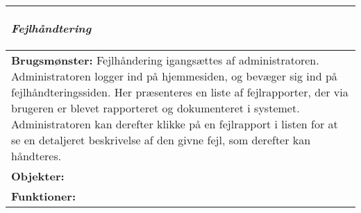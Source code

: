 \begin{tabular}{p{\textwidth}}
    \hline
    \begin{center} 
    \textbf{\textit{Fejlhåndtering}} 
    \end{center} \\ \hline
    \textbf{Brugsmønster:} Fejlhåndering igangsættes af administratoren. Administratoren logger ind på hjemmesiden, og bevæger sig ind på fejlhåndteringssiden. Her præsenteres en liste af  fejlrapporter, der via brugeren er blevet rapporteret og dokumenteret i systemet. Administratoren kan derefter klikke på en fejlrapport i listen for at se en detaljeret beskrivelse af den givne fejl, som derefter kan håndteres. \\
    \textbf{Objekter:}  \\
    \textbf{Funktioner:}  \\ \hline
\end{tabular}